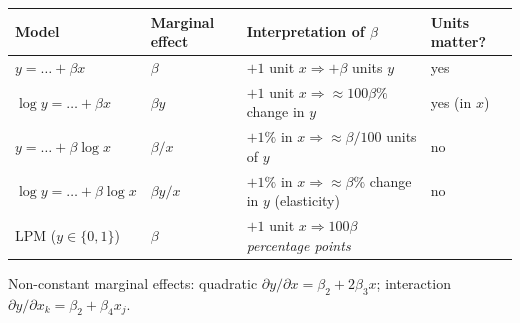 \documentclass[11pt]{article}
\begin{document}
\begin{center}
\renewcommand{\arraystretch}{1.25}
\begin{tabular}{@{}llll@{}}\toprule
Model & Marginal effect & Interpretation of $\beta$ & Units matter?\\\midrule
$y=\ldots+\beta x$ & $\beta$ & $+1$ unit $x\Rightarrow+\beta$ units $y$ & yes\\
$\log y=\ldots+\beta x$ & $\beta y$ & $+1$ unit $x\Rightarrow\approx100\beta\%$ change in $y$ & yes (in $x$)\\
$y=\ldots+\beta\log x$ & $\beta/x$ & $+1\%$ in $x\Rightarrow\approx\beta/100$ units of $y$ & no\\
$\log y=\ldots+\beta\log x$ & $\beta y/x$ & $+1\%$ in $x\Rightarrow\approx\beta\%$ change in $y$ (elasticity) & no\\
LPM ($y\in\{0,1\}$) & $\beta$ & $+1$ unit $x\Rightarrow 100\beta$ \emph{percentage points} & \\\bottomrule
\end{tabular}
\end{center}
Non-constant marginal effects: quadratic $\partial y/\partial x=\beta_2+2\beta_3x$; interaction $\partial y/\partial x_k=\beta_2+\beta_4x_j$.

\newpage
\end{document}
